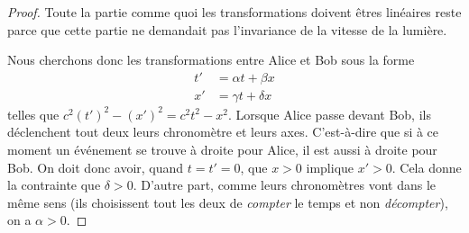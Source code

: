 \begin{proof}
	Toute la partie comme quoi les transformations doivent êtres linéaires reste parce que cette partie ne demandait pas l'invariance de la vitesse de la lumière.

    Nous cherchons donc les transformations entre Alice et Bob sous la forme
	\[
	\begin{split}
		t'&=\alpha t+\beta x\\
		x'&=\gamma t+\delta x
	\end{split}
	\]
	telles que $c^2(t')^2-(x')^2=c^2t^2-x^2$. Lorsque Alice passe devant Bob, ils déclenchent tout deux leurs chronomètre et leurs axes. C'est-à-dire que si à ce moment un événement se trouve à droite pour Alice, il est aussi à droite pour Bob. On doit donc avoir, quand $t=t'=0$, que $x>0$ implique $x'>0$. Cela donne la contrainte que $\delta>0$. D'autre part, comme leurs chronomètres vont dans le même sens (ils choisissent tout les deux de \emph{compter} le temps et non \emph{décompter}), on a $\alpha>0$.


\end{proof}
